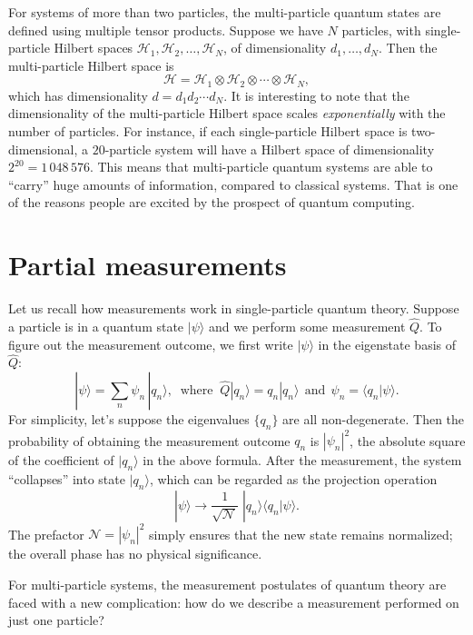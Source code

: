 \documentclass[pra,11pt]{revtex4}
\begin{document}
For systems of more than two particles, the multi-particle quantum
states are defined using multiple tensor products.  Suppose we have
$N$ particles, with single-particle Hilbert spaces $\mathscr{H}_1,
\mathscr{H}_2, \dots, \mathscr{H}_N$, of dimensionality $d_1, \dots,
d_N$.  Then the multi-particle Hilbert space is
$$\mathscr{H} = \mathscr{H}_1 \otimes \mathscr{H}_2 \otimes \cdots
\otimes \mathscr{H}_N,$$
which has dimensionality $d = d_1 d_2\cdots d_N$.  It is interesting
to note that the dimensionality of the multi-particle Hilbert space
scales \textit{exponentially} with the number of particles.  For
instance, if each single-particle Hilbert space is two-dimensional, a
$20$-particle system will have a Hilbert space of dimensionality
$2^{20} =1\,048\,576$.  This means that multi-particle quantum systems
are able to ``carry'' huge amounts of information, compared to
classical systems.  That is one of the reasons people are excited by
the prospect of quantum computing.

\section{Partial measurements}
\label{sec:partialmeasurements}

Let us recall how measurements work in single-particle quantum theory.
Suppose a particle is in a quantum state $|\psi\rangle$ and we perform
some measurement $\hat{Q}$.  To figure out the measurement outcome, we
first write $|\psi\rangle$ in the eigenstate basis of $\hat{Q}$:
$$|\psi\rangle = \sum_n \psi_n\, |q_n\rangle, \;\;\mathrm{where}\;\;\hat{Q}|q_n\rangle = q_n |q_n\rangle \;\,\textrm{and}\;\, \psi_n = \langle q_n|\psi\rangle.$$
For simplicity, let's suppose the eigenvalues $\{q_n\}$ are all
non-degenerate.  Then the probability of obtaining the measurement
outcome $q_n$ is $|\psi_n|^2$, the absolute square of the coefficient
of $|q_n\rangle$ in the above formula.  After the measurement, the
system ``collapses'' into state $|q_n\rangle$, which can be regarded as
the projection operation
$$|\psi\rangle \longrightarrow \frac{1}{\sqrt{\mathcal{N}}}\; |q_n\rangle\langle q_n|\psi\rangle.$$
The prefactor $\mathcal{N} = |\psi_n|^2$ simply ensures that the new
state remains normalized; the overall phase has no physical
significance.

For multi-particle systems, the measurement postulates of quantum
theory are faced with a new complication: how do we describe a
measurement performed on just one particle?
\end{document}

